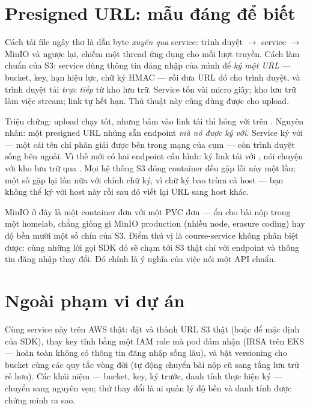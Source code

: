 \section{Presigned URL: mẫu đáng để biết}

Cách tải file ngây thơ là dẫn byte \emph{xuyên qua} service: trình duyệt
$\rightarrow$ service $\rightarrow$ MinIO và ngược lại, chiếm một thread
ứng dụng cho mỗi lượt truyền. Cách làm chuẩn của S3: service dùng thông
tin đăng nhập của mình để \emph{ký một URL} --- bucket, key, hạn hiệu
lực, chữ ký HMAC --- rồi đưa URL đó cho trình duyệt, và trình duyệt tải
\emph{trực tiếp} từ kho lưu trữ. Service tốn vài micro giây; kho lưu trữ
làm việc stream; link tự hết hạn. Thủ thuật này cũng dùng được cho
upload.

\begin{pitfall}
Triệu chứng: upload chạy tốt, nhưng bấm vào link tải thì hỏng với
 trên . Nguyên nhân: một
presigned URL nhúng sẵn endpoint \emph{mà nó được ký với}. Service ký
với  --- một cái tên chỉ phân giải được bên trong mạng
của cụm --- còn trình duyệt sống bên ngoài. Vì thế mới có hai endpoint
cấu hình: ký link tải với , nói chuyện với kho lưu
trữ qua . Mọi hệ thống S3 đóng container đều gặp lỗi này
một lần; một số gặp lại lần nữa với chính chữ ký, vì chữ ký bao trùm cả
host --- bạn không thể ký với host này rồi sau đó viết lại URL sang host
khác.
\end{pitfall}

\begin{hardware}
MinIO ở đây là một container đơn với một PVC đơn --- ổn cho bài nộp
trong một homelab, chẳng giống gì MinIO production (nhiều node, erasure
coding) hay độ bền mười một số chín của S3. Điểm thú vị là course-service
không phân biệt được: cùng những lời gọi SDK đó sẽ chạm tới S3 thật chỉ
với endpoint và thông tin đăng nhập thay đổi. Đó chính là ý nghĩa của
việc nói một API chuẩn.
\end{hardware}

\section{Ngoài phạm vi dự án}

Cùng service này trên AWS thật: đặt  và
 thành URL S3 thật (hoặc để mặc định của SDK), thay
key tĩnh bằng một IAM role mà pod đảm nhận (IRSA trên EKS --- hoàn toàn
không có thông tin đăng nhập sống lâu), và bật versioning cho bucket cùng
các quy tắc vòng đời (tự động chuyển bài nộp cũ sang tầng lưu trữ rẻ
hơn). Các khái niệm --- bucket, key, ký trước, danh tính thực hiện ký ---
chuyển sang nguyên vẹn; thứ thay đổi là ai quản lý độ bền và danh tính
được chứng minh ra sao.

